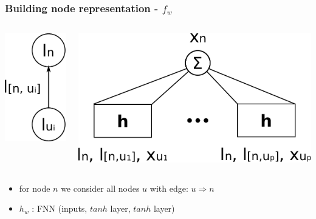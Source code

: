 \documentclass{beamer}
\begin{document}
\begin{frame}
\frametitle{Building node representation - $f_w$}
\begin{columns}
	\begin{column}{0.2\textwidth}
		\begin{center}
			\includegraphics[scale=0.4]{img/connection}
		\end{center}
	\end{column}
	\begin{column}{0.8\textwidth}
		\begin{center}
			\includegraphics[scale=0.4]{img/f}
		\end{center}
	\end{column}
\end{columns}
\medskip
\begin{itemize}
	\item for node $n$ we consider all nodes $u$ with edge: $u \Rightarrow n$
	\item $h_w$ : FNN (inputs, $tanh$ layer, $tanh$ layer)
\end{itemize}
\end{frame}
\end{document}
